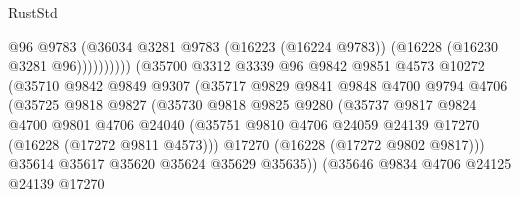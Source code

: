 \begin{lexlean}{RustStd}
\begin{coremodule}
                                        @96
                                        @9783
                                        (@36034
                                          @3281
                                          @9783
                                          (@16223 (@16224 @9783))
                                          (@16228 (@16230 @3281 @96))))))))))
                          (@35700
                            @3312
                            @3339
                            @96
                            @9842
                            @9851
                            @4573
                            @10272
                            (@35710
                              @9842
                              @9849
                              @9307
                              (@35717
                                @9829
                                @9841
                                @9848
                                @4700
                                @9794
                                @4706
                                (@35725
                                  @9818
                                  @9827
                                  (@35730
                                    @9818
                                    @9825
                                    @9280
                                    (@35737
                                      @9817
                                      @9824
                                      @4700
                                      @9801
                                      @4706
                                      @24040
                                      (@35751
                                        @9810
                                        @4706
                                        @24059
                                        @24139
                                        @17270
                                        (@16228 (@17272 @9811 @4573)))
                                      @17270
                                      (@16228 (@17272 @9802 @9817)))
                                    @35614
                                    @35617
                                    @35620
                                    @35624
                                    @35629
                                    @35635))
                                (@35646
                                  @9834
                                  @4706
                                  @24125
                                  @24139
                                  @17270

\end{coremodule}
\end{lexlean}
